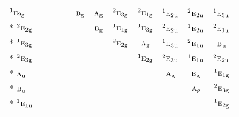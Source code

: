 \documentclass[10pt,a4paper]{article}
\numberwithin{equation}{section}
\newcommand{\irr}[1]{\text{\normalfont\scshape #1}}
\newcommand{\conjpair}[1]{{}^{#1}}
\newcommand{\ptag}[1]{\mathrm{#1}}
\begin{document}
{\begin{longtable}{@{}lccccccccccc@{}}
$\conjpair{1}\irr{e}_{2\ptag{g}}$ &  &  &  &  & $\irr{b}_{\ptag{g}}$ & $\irr{a}_{\ptag{g}}$ & $\conjpair{2}\irr{e}_{3\ptag{g}}$ & $\conjpair{2}\irr{e}_{1\ptag{g}}$ & $\conjpair{1}\irr{e}_{2\ptag{u}}$ & $\conjpair{2}\irr{e}_{2\ptag{u}}$ & $\conjpair{1}\irr{e}_{3\ptag{u}}$\\*
$\conjpair{2}\irr{e}_{2\ptag{g}}$ &  &  &  &  &  & $\irr{b}_{\ptag{g}}$ & $\conjpair{1}\irr{e}_{1\ptag{g}}$ & $\conjpair{1}\irr{e}_{3\ptag{g}}$ & $\conjpair{2}\irr{e}_{2\ptag{u}}$ & $\conjpair{1}\irr{e}_{2\ptag{u}}$ & $\conjpair{2}\irr{e}_{1\ptag{u}}$\\*
$\conjpair{1}\irr{e}_{3\ptag{g}}$ &  &  &  &  &  &  & $\conjpair{2}\irr{e}_{2\ptag{g}}$ & $\irr{a}_{\ptag{g}}$ & $\conjpair{1}\irr{e}_{3\ptag{u}}$ & $\conjpair{2}\irr{e}_{1\ptag{u}}$ & $\irr{b}_{\ptag{u}}$\\*
$\conjpair{2}\irr{e}_{3\ptag{g}}$ &  &  &  &  &  &  &  & $\conjpair{1}\irr{e}_{2\ptag{g}}$ & $\conjpair{2}\irr{e}_{3\ptag{u}}$ & $\conjpair{1}\irr{e}_{1\ptag{u}}$ & $\conjpair{2}\irr{e}_{2\ptag{u}}$\\*
$\irr{a}_{\ptag{u}}$ &  &  &  &  &  &  &  &  & $\irr{a}_{\ptag{g}}$ & $\irr{b}_{\ptag{g}}$ & $\conjpair{1}\irr{e}_{1\ptag{g}}$\\*
$\irr{b}_{\ptag{u}}$ &  &  &  &  &  &  &  &  &  & $\irr{a}_{\ptag{g}}$ & $\conjpair{2}\irr{e}_{3\ptag{g}}$\\*
$\conjpair{1}\irr{e}_{1\ptag{u}}$ &  &  &  &  &  &  &  &  &  &  & $\conjpair{1}\irr{e}_{2\ptag{g}}$\\
\bottomrule\end{longtable}}
\end{document}
